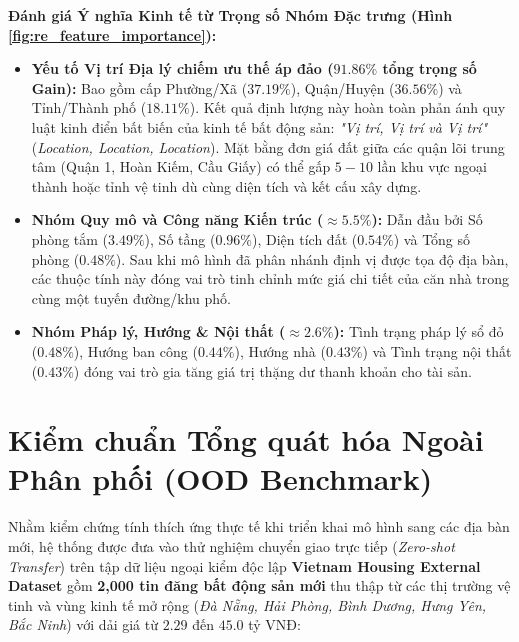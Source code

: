 \documentclass[12pt,a4paper]{report}
\begin{document}
\textbf{Đánh giá Ý nghĩa Kinh tế từ Trọng số Nhóm Đặc trưng (Hình \ref{fig:re_feature_importance}):}
\begin{itemize}[leftmargin=1.5em]
    \item \textbf{Yếu tố Vị trí Địa lý chiếm ưu thế áp đảo ($\mathbf{91.86\%}$ tổng trọng số Gain):} Bao gồm cấp Phường/Xã ($37.19\%$), Quận/Huyện ($36.56\%$) và Tỉnh/Thành phố ($18.11\%$). Kết quả định lượng này hoàn toàn phản ánh quy luật kinh điển bất biến của kinh tế bất động sản: \textit{"Vị trí, Vị trí và Vị trí"} (\textit{Location, Location, Location}). Mặt bằng đơn giá đất giữa các quận lõi trung tâm (Quận 1, Hoàn Kiếm, Cầu Giấy) có thể gấp $5 - 10$ lần khu vực ngoại thành hoặc tỉnh vệ tinh dù cùng diện tích và kết cấu xây dựng.
    \item \textbf{Nhóm Quy mô và Công năng Kiến trúc ($\approx \mathbf{5.5\%}$):} Dẫn đầu bởi Số phòng tắm ($3.49\%$), Số tầng ($0.96\%$), Diện tích đất ($0.54\%$) và Tổng số phòng ($0.48\%$). Sau khi mô hình đã phân nhánh định vị được tọa độ địa bàn, các thuộc tính này đóng vai trò tinh chỉnh mức giá chi tiết của căn nhà trong cùng một tuyến đường/khu phố.
    \item \textbf{Nhóm Pháp lý, Hướng \& Nội thất ($\approx \mathbf{2.6\%}$):} Tình trạng pháp lý sổ đỏ ($0.48\%$), Hướng ban công ($0.44\%$), Hướng nhà ($0.43\%$) và Tình trạng nội thất ($0.43\%$) đóng vai trò gia tăng giá trị thặng dư thanh khoản cho tài sản.
\end{itemize}

\section{Kiểm chuẩn Tổng quát hóa Ngoài Phân phối (OOD Benchmark)}

Nhằm kiểm chứng tính thích ứng thực tế khi triển khai mô hình sang các địa bàn mới, hệ thống được đưa vào thử nghiệm chuyển giao trực tiếp (\textit{Zero-shot Transfer}) trên tập dữ liệu ngoại kiểm độc lập \textbf{Vietnam Housing External Dataset} gồm \textbf{2,000 tin đăng bất động sản mới} thu thập từ các thị trường vệ tinh và vùng kinh tế mở rộng (\textit{Đà Nẵng, Hải Phòng, Bình Dương, Hưng Yên, Bắc Ninh}) với dải giá từ $2.29$ đến $45.0$ tỷ VNĐ:
\end{document}
